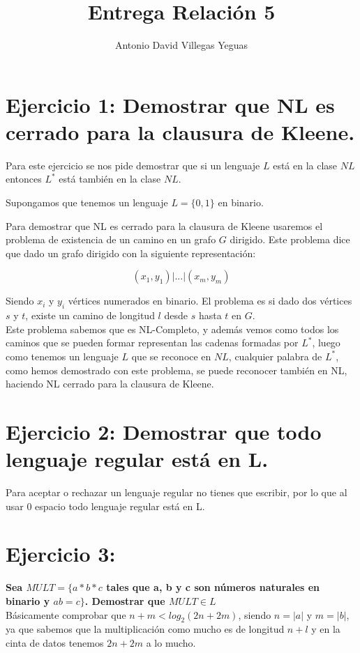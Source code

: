 \documentclass{article}
\title{Entrega Relación 5}
\author{Antonio David Villegas Yeguas}
\date{}
\begin{document}
\maketitle


\section*{Ejercicio 1: Demostrar que NL es cerrado para la clausura de Kleene.}

Para este ejercicio se nos pide demostrar que si un lenguaje $L$ está en la clase $NL$ entonces $L^*$ está también en la clase $NL$.

Supongamos que tenemos un lenguaje $L = \{0, 1\}$ en binario.

Para demostrar que NL es cerrado para la clausura de Kleene usaremos el problema de existencia de un camino en un grafo $G$ dirigido. Este problema dice que dado un grafo dirigido con la siguiente representación:

$$ (x_1, y_1)|...|(x_m, y_m) $$

Siendo $x_i$ y $y_i$ vértices numerados en binario. El problema es si dado dos vértices $s$ y $t$, existe un camino de longitud $l$ desde $s$ hasta $t$ en $G$. \\


Este problema sabemos que es NL-Completo, y además vemos como todos los caminos que se pueden formar representan las cadenas formadas por $L^*$, luego como tenemos un lenguaje $L$ que se reconoce en $NL$, cualquier palabra de $L^*$, como hemos demostrado con este problema, se puede reconocer también en NL, haciendo NL cerrado para la clausura de Kleene.

\section*{Ejercicio 2: Demostrar que todo lenguaje regular está en L.}

Para aceptar o rechazar un lenguaje regular no tienes que escribir, por lo que al usar 0 espacio todo lenguaje regular está en L.

\section*{Ejercicio 3:}

\Large{\textbf{Sea $MULT = \{a * b * c$ tales que a, b y c son números naturales en binario y $a  b = c\}$. Demostrar que $MULT \in L$}}
\\

\normalsize
Básicamente comprobar que $n + m < log_2(2n + 2m)$, siendo $n = |a|$ y $m = |b|$, ya que sabemos que la multiplicación como mucho es de longitud $n + l$ y en la cinta de datos tenemos $2n + 2m$ a lo mucho.
\end{document}
